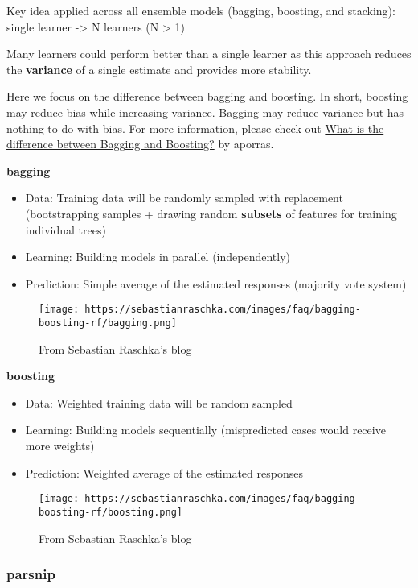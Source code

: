 \documentclass[
]{book}
\begin{document}
Key idea applied across all ensemble models (bagging, boosting, and stacking):
single learner -\textgreater{} N learners (N \textgreater{} 1)

Many learners could perform better than a single learner as this approach reduces the \textbf{variance} of a single estimate and provides more stability.

Here we focus on the difference between bagging and boosting. In short, boosting may reduce bias while increasing variance. Bagging may reduce variance but has nothing to do with bias. For more information, please check out \href{https://quantdare.com/what-is-the-difference-between-bagging-and-boosting/}{What is the difference between Bagging and Boosting?} by aporras.

\textbf{bagging}

\begin{itemize}
\item
  Data: Training data will be randomly sampled with replacement (bootstrapping samples + drawing random \textbf{subsets} of features for training individual trees)
\item
  Learning: Building models in parallel (independently)
\item
  Prediction: Simple average of the estimated responses (majority vote system)
\end{itemize}

\begin{figure}
\centering
\texttt{[image: https://sebastianraschka.com/images/faq/bagging-boosting-rf/bagging.png]}
\caption{From Sebastian Raschka's blog}
\end{figure}

\textbf{boosting}

\begin{itemize}
\item
  Data: Weighted training data will be random sampled
\item
  Learning: Building models sequentially (mispredicted cases would receive more weights)
\item
  Prediction: Weighted average of the estimated responses
\end{itemize}

\begin{figure}
\centering
\texttt{[image: https://sebastianraschka.com/images/faq/bagging-boosting-rf/boosting.png]}
\caption{From Sebastian Raschka's blog}
\end{figure}

\hypertarget{parsnip-2}{%
\subsubsection{parsnip}\label{parsnip-2}}
\end{document}
